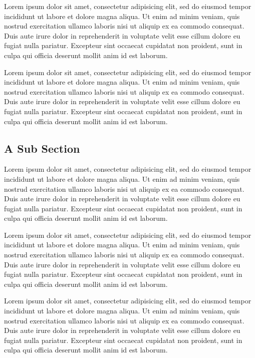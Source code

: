 \documentclass[a0,landscape]{a0poster}
\begin{document}
Lorem ipsum dolor sit amet, consectetur adipisicing elit, sed do eiusmod
tempor incididunt ut labore et dolore magna aliqua. Ut enim ad minim
veniam, quis nostrud exercitation ullamco laboris nisi ut aliquip ex ea
commodo consequat. Duis aute irure dolor in reprehenderit in voluptate
velit esse cillum dolore eu fugiat nulla pariatur. Excepteur sint occaecat
cupidatat non proident, sunt in culpa qui officia deserunt mollit anim
id est laborum.

Lorem ipsum dolor sit amet, consectetur adipisicing elit, sed do eiusmod
tempor incididunt ut labore et dolore magna aliqua. Ut enim ad minim
veniam, quis nostrud exercitation ullamco laboris nisi ut aliquip ex ea
commodo consequat. Duis aute irure dolor in reprehenderit in voluptate
velit esse cillum dolore eu fugiat nulla pariatur. Excepteur sint occaecat
cupidatat non proident, sunt in culpa qui officia deserunt mollit anim
id est laborum.

\subsection{A Sub Section}

Lorem ipsum dolor sit amet, consectetur adipisicing elit, sed do eiusmod
tempor incididunt ut labore et dolore magna aliqua. Ut enim ad minim
veniam, quis nostrud exercitation ullamco laboris nisi ut aliquip ex ea
commodo consequat. Duis aute irure dolor in reprehenderit in voluptate
velit esse cillum dolore eu fugiat nulla pariatur. Excepteur sint occaecat
cupidatat non proident, sunt in culpa qui officia deserunt mollit anim
id est laborum.

Lorem ipsum dolor sit amet, consectetur adipisicing elit, sed do eiusmod
tempor incididunt ut labore et dolore magna aliqua. Ut enim ad minim
veniam, quis nostrud exercitation ullamco laboris nisi ut aliquip ex ea
commodo consequat. Duis aute irure dolor in reprehenderit in voluptate
velit esse cillum dolore eu fugiat nulla pariatur. Excepteur sint occaecat
cupidatat non proident, sunt in culpa qui officia deserunt mollit anim
id est laborum.

Lorem ipsum dolor sit amet, consectetur adipisicing elit, sed do eiusmod
tempor incididunt ut labore et dolore magna aliqua. Ut enim ad minim
veniam, quis nostrud exercitation ullamco laboris nisi ut aliquip ex ea
commodo consequat. Duis aute irure dolor in reprehenderit in voluptate
velit esse cillum dolore eu fugiat nulla pariatur. Excepteur sint occaecat
cupidatat non proident, sunt in culpa qui officia deserunt mollit anim
id est laborum.
\end{document}

